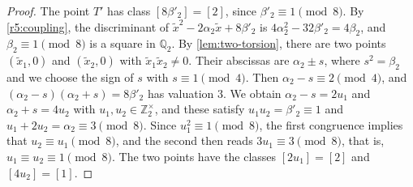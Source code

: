 \documentclass[12pt,oneside,openany]{book}
\theoremstyle{definition}
\theoremstyle{plain}
\numberwithin{equation}{chapter}
\theoremstyle{plain}
\theoremstyle{definition}
\theoremstyle{remark}
\newcommand{\Q}{\mathbb Q}
\newcommand{\Z}{\mathbb Z}
\newcommand{\sq}[1]{[#1]}
\begin{document}
\begin{proof}
The point $T'$ has class $\sq{8\beta'_2}=\sq2$, since $\beta'_2\equiv1\pmod8$. By \eqref{r5:coupling}, the discriminant of $\tilde x^2-2\alpha_2 \tilde x+8\beta'_2$ is $4\alpha_2^2-32\beta'_2=4\beta_2$, and $\beta_2\equiv1\pmod8$ is a square in $\Q_2$. By \cref{lem:two-torsion}, there are two points $(\tilde x_1,0)$ and $(\tilde x_2,0)$ with $\tilde x_1\tilde x_2\ne0$. Their abscissas are $\alpha_2\pm s$, where $s^2=\beta_2$ and we choose the sign of $s$ with $s\equiv1\pmod4$. Then $\alpha_2-s\equiv2\pmod4$, and $(\alpha_2-s)(\alpha_2+s)=8\beta'_2$ has valuation $3$. We obtain $\alpha_2-s=2u_1$ and $\alpha_2+s=4u_2$ with $u_1,u_2\in\Z_2^\times$, and these satisfy $u_1u_2=\beta'_2\equiv1$ and $u_1+2u_2=\alpha_2\equiv3\pmod8$. Since $u_1^2\equiv1\pmod8$, the first congruence implies that $u_2\equiv u_1\pmod8$, and the second then reads $3u_1\equiv3\pmod 8$, that is, $u_1\equiv u_2\equiv1\pmod8$. The two points have the classes $\sq{2u_1}=\sq2$ and $\sq{4u_2}=\sq1$.


\end{proof}
\end{document}
